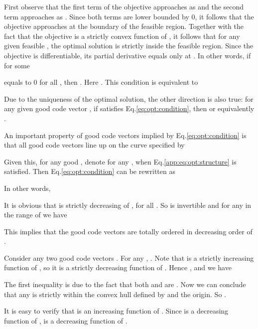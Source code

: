 \documentclass[journal]{IEEEtran}
\begin{document}
\begin{IEEEproof} 
First observe that the first term of the objective approaches  as  and the second term approaches  as . Since both terms are lower bounded by 0, it follows that the objective approaches  at the boundary of the feasible region. Together with the fact that the objective is a strictly convex function of , it follows that for any given feasible ,  the optimal solution  is strictly inside the feasible region. Since the objective is differentiable, its partial derivative equals  only at . In other words, if for some  

equals to 0 for all , then . 
Here . This condition is equivalent to 

Due to the uniqueness of the optimal solution, the other direction is also true: for any given good code vector , if  satisfies Eq.\ref{eq:opt:condition}, then  or equivalently . 

An important property of good code vectors implied by Eq.\ref{eq:opt:condition} is that all good code vectors line up on the curve specified by 

Given this, for any good , denote  for any , when Eq.\ref{app:eq:opt:structure} is satisfied. Then Eq.\ref{eq:opt:condition} can be rewritten as

In other words,


It is obvious that  is strictly decreasing of , for all . So  is invertible and for any  in the range of  we have

This implies that the good code vectors are totally ordered in  decreasing order of . 

Consider any two good code vectors . For any , . 
Note that  is a strictly increasing function of , so it is a strictly decreasing function of . Hence , and we have

The first inequality is due to the fact that both  and  are . Now we can conclude that any  is strictly within the convex hull defined by  and the origin. So .

It is easy to verify that  is an increasing function of . Since  is a decreasing function of ,  is a decreasing function of . 
\end{IEEEproof}
\end{document}
